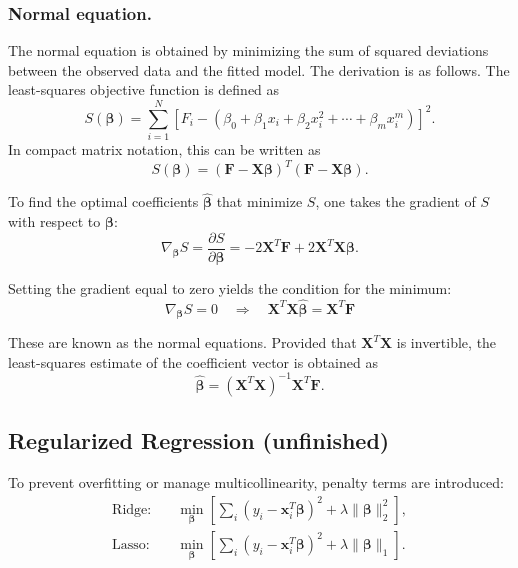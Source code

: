 \documentclass[../../../main.tex]{subfiles}
\begin{document}
\subsubsection{Normal equation.}
The normal equation is obtained by minimizing the sum of squared deviations between the observed data and the fitted model.
The derivation is as follows.
The least-squares objective function is defined as
\begin{equation*}
    S(\boldsymbol{\beta}) = \sum_{i=1}^{N}
    \left[ F_i - \left( \beta_0 + \beta_1 x_i + \beta_2 x_i^2 + \cdots + \beta_m x_i^m \right) \right]^2.
\end{equation*}
In compact matrix notation, this can be written as
\begin{equation*}
    S(\boldsymbol{\beta}) = (\mathbf{F} - \mathbf{X}\boldsymbol{\beta})^{T}(\mathbf{F} - \mathbf{X}\boldsymbol{\beta}).
\end{equation*}

To find the optimal coefficients \(\hat{\boldsymbol{\beta}}\) that minimize \(S\), one takes the gradient of \(S\) with respect to \(\boldsymbol{\beta}\):
\begin{equation*}
    \nabla_{\boldsymbol{\beta}} S =
    \frac{\partial S}{\partial \boldsymbol{\beta}}
    = -2\mathbf{X}^{T}\mathbf{F} + 2\mathbf{X}^{T}\mathbf{X}\boldsymbol{\beta}.
\end{equation*}

Setting the gradient equal to zero yields the condition for the minimum:
\begin{equation*}
    \nabla_{\boldsymbol{\beta}} S = 0
    \quad \Longrightarrow \quad
    \mathbf{X}^{T}\mathbf{X}\hat{\boldsymbol{\beta}} = \mathbf{X}^{T}\mathbf{F}
\end{equation*}

These are known as the normal equations.
Provided that \(\mathbf{X}^{T}\mathbf{X}\) is invertible, the least-squares estimate of the coefficient vector is obtained as
\begin{equation*}
    \hat{\boldsymbol{\beta}} = (\mathbf{X}^{T}\mathbf{X})^{-1}\mathbf{X}^{T}\mathbf{F}.
\end{equation*}

\subsection{Regularized Regression (unfinished)}
To prevent overfitting or manage multicollinearity, penalty terms are introduced:
\begin{align*}
    \text{Ridge:} & \quad \min_{\boldsymbol{\beta}} \left[ \sum_i (y_i - \mathbf{x}_i^T \boldsymbol{\beta})^2 + \lambda \|\boldsymbol{\beta}\|_2^2 \right], \\
    \text{Lasso:} & \quad \min_{\boldsymbol{\beta}} \left[ \sum_i (y_i - \mathbf{x}_i^T \boldsymbol{\beta})^2 + \lambda \|\boldsymbol{\beta}\|_1 \right].
\end{align*}
\end{document}
